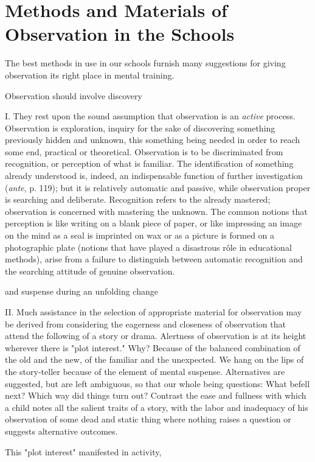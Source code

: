 \documentclass[letterpaper]{book}
\begin{document}
\section{Methods and Materials of Observation in the Schools} The best
methods in use in our schools furnish many suggestions for giving
observation its right place in mental training.

Observation should involve discovery

I. They rest upon the sound assumption that observation is an
\emph{active} process. Observation is exploration, inquiry for the sake
of discovering something previously hidden and unknown, this something
being needed in order to reach some end, practical or theoretical.
Observation is to be discriminated from recognition, or perception of
what is familiar. The identification of something already understood is,
indeed, an indispensable function of further investigation (\emph{ante},
p. 119); but it is relatively automatic and passive, while observation
proper is searching and deliberate. Recognition refers to the already
mastered; observation is concerned with mastering the unknown. The
common notions that perception is like writing on a blank piece of
paper, or like impressing an image on the mind as a seal is imprinted on
wax or as a picture is formed on a photographic plate (notions that have
played a disastrous rôle in educational methods), arise from a failure
to distinguish between automatic recognition and the searching attitude
of genuine observation.

and suspense during an unfolding change

II. Much assistance in the selection of appropriate material for
observation may be derived from considering the eagerness and closeness
of observation that attend the following of a story or drama. Alertness
of observation is at its height wherever there is "plot interest." Why?
Because of the balanced combination of the old and the new, of the
familiar and the unexpected. We hang on the lips of the story-teller
because of the element of mental suspense. Alternatives are
suggested,
but are left ambiguous, so that our whole being questions: What befell
next? Which way did things turn out? Contrast the ease and fullness with
which a child notes all the salient traits of a story, with the labor
and inadequacy of his observation of some dead and static thing where
nothing raises a question or suggests alternative outcomes.

This "plot interest" manifested in activity,
\end{document}

